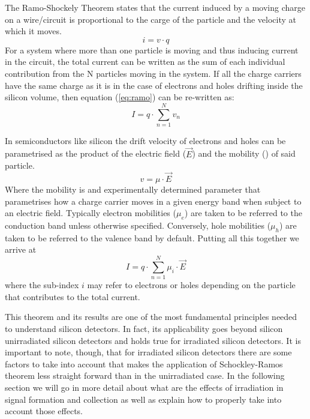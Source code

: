 The Ramo-Shockely Theorem states that the current induced by a moving charge on a wire/circuit is proportional to the carge of the particle and the velocity at which it moves. 
\begin{equation}
	i = v \cdot q
	\label{eq:ramo} 
\end{equation} 
For a system where more than one particle is moving and thus inducing current in the circuit, the total current can be written as the sum of each individual contribution from the N particles moving in the system. If all the charge carriers have the same charge as it is in the case of electrons and holes drifting inside the silicon volume, then equation (\ref{eq:ramo}) can be re-written as:
\begin{equation}
	I = q \cdot \sum_{n=1}^{N} v_n 	\label{eq:ramoTot} 
\end{equation} 

In semiconductors like silicon the drift velocity of electrons and holes can be parametrised as the product of the electric field ($ \vec E $) and the mobility (\mu) of said particle.\[v = \mu \cdot \vec E\] Where the mobility is and experimentally determined parameter that parametrises how a charge carrier moves in a given energy band when subject to an electric field. Typically electron mobilities ($ \mu_e $) are taken to be referred to the conduction band unless otherwise specified. Conversely, hole mobilities ($ \mu_h $) are taken to be referred to the valence band by default. Putting all this together we arrive at
\begin{equation}
	I = q \cdot \sum_{n=1}^{N} \mu_i \cdot \vec{E} 
\label{eq:ramoMob}
\end{equation}
where the sub-index $i$ may refer to electrons or holes depending on the particle that contributes to the total current.

This theorem and its results are one of the most fundamental principles needed to understand silicon detectors. In fact, its applicability goes beyond silicon unirradiated silicon detectors and holds true for irradiated silicon detectors. It is important to note, though, that for irradiated silicon detectors there are some factors to take into account that makes the application of Schockley-Ramos theorem less straight forward than in the unirradiated case. In the following section we will go in more detail about what are the effects of irradiation in signal formation and collection as well as explain how to properly take into account those effects.
